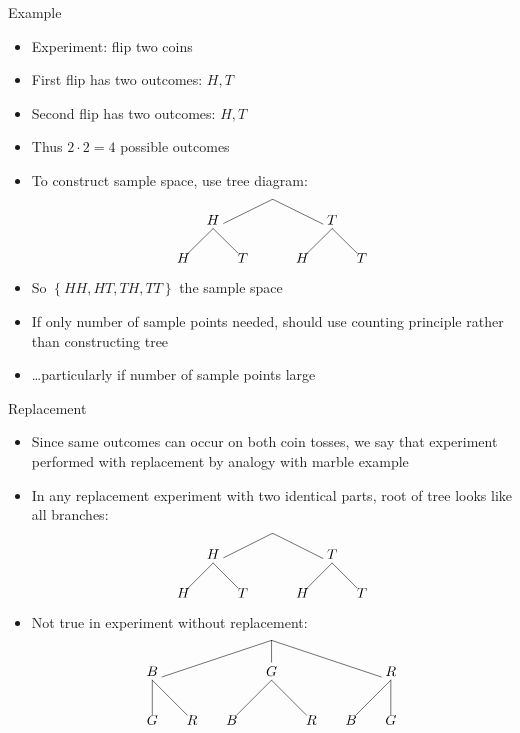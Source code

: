 \documentclass{beamer}
\theoremstyle{definition}
\begin{document}
\begin{frame}{Example}
\begin{itemize}
\item Experiment: flip two coins
\item First flip has two outcomes: $H,T$
\item Second flip has two outcomes: $H,T$
\item Thus $2\cdot 2=4$ possible outcomes
\item To construct sample space, use tree diagram:
\[\begin{xy}<.75cm,0cm>:
(0,0)="0";
(-2,-1)="-21";
(2,-1)="21";
"0";"-21"*+!D{H}**\dir{-};
"0";"21"*+!D{T}**\dir{-};
"-21";(-3,-2)*{H}**\dir{-};
"-21";(-1,-2)*{T}**\dir{-};
"21";(1,-2)*{H}**\dir{-};
"21";(3,-2)*{T}**\dir{-};
\end{xy}\]
\item So $\left\{HH,HT,TH,TT\right\}$ the sample space
\item If only \alert{number} of sample points needed,
should use counting principle rather than constructing tree
\item \dots particularly if number of sample points large
\end{itemize}
\end{frame}

\begin{frame}{Replacement}
\begin{itemize}
\item Since same outcomes can occur on both coin
tosses, we say that experiment performed \alert{with replacement}
by analogy with marble example
\item In any replacement experiment with two identical parts,
root of tree looks like all branches:
\[\begin{xy}<.75cm,0cm>:
(0,0)="0";
(-2,-1)="-21";
(2,-1)="21";
"0";"-21"*+!D{H}**\dir{-};
"0";"21"*+!D{T}**\dir{-};
"-21";(-3,-2)*{H}**\dir{-};
"-21";(-1,-2)*{T}**\dir{-};
"21";(1,-2)*{H}**\dir{-};
"21";(3,-2)*{T}**\dir{-};
\end{xy}\]
\item Not true in experiment \alert{without replacement}:
\[\begin{xy}<1cm,0cm>:
(0,0)="0";
(-3,-1)="-31";
(0,-1)="01";
(3,-1)="31";
"0";"-31"*+!D{B}**\dir{-};
"0";"01"*+!D{G}**\dir{-};
"0";"31"*+!D{R}**\dir{-};
"-31";(-3,-2)*{G}**\dir{-};
"-31";(-2,-2)*{R}**\dir{-};
"01";(-1,-2)*{B}**\dir{-};
"01";(1,-2)*{R}**\dir{-};
"31";(2,-2)*{B}**\dir{-};
"31";(3,-2)*{G}**\dir{-};
\end{xy}\]
\end{itemize}
\end{frame}
\end{document}
